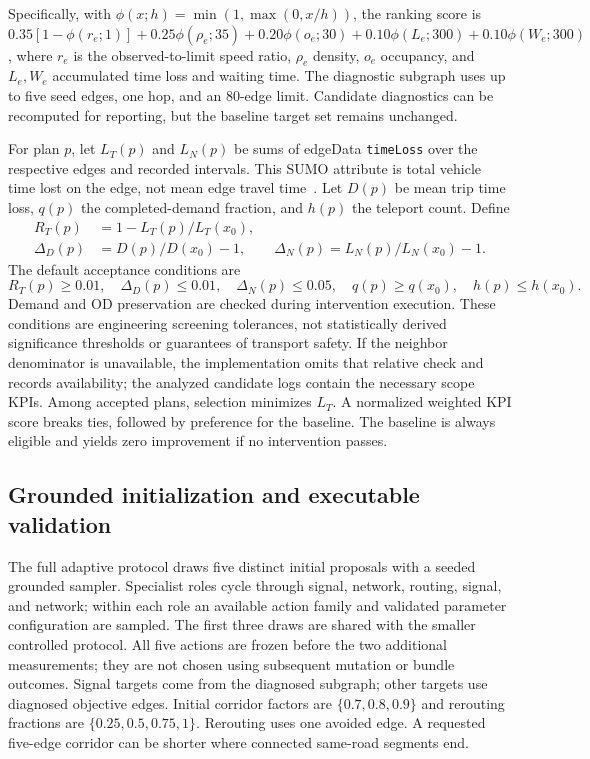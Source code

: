 \documentclass[11pt]{article}
\begin{document}
Specifically, with $\phi(x;h)=\min(1,\max(0,x/h))$, the ranking score is $0.35[1-\phi(r_e;1)]+0.25\phi(\rho_e;35)+0.20\phi(o_e;30)+0.10\phi(L_e;300)+0.10\phi(W_e;300)$, where $r_e$ is the observed-to-limit speed ratio, $\rho_e$ density, $o_e$ occupancy, and $L_e,W_e$ accumulated time loss and waiting time. The diagnostic subgraph uses up to five seed edges, one hop, and an 80-edge limit. Candidate diagnostics can be recomputed for reporting, but the baseline target set remains unchanged.

For plan $p$, let $L_T(p)$ and $L_N(p)$ be sums of edgeData \texttt{timeLoss} over the respective edges and recorded intervals. This SUMO attribute is total vehicle time lost on the edge, not mean edge travel time~\cite{sumoEdgeData}. Let $D(p)$ be mean trip time loss, $q(p)$ the completed-demand fraction, and $h(p)$ the teleport count. Define
\begin{align}
R_T(p)&=1-L_T(p)/L_T(x_0),\\
\Delta_D(p)&=D(p)/D(x_0)-1,\qquad
\Delta_N(p)=L_N(p)/L_N(x_0)-1.
\end{align}
The default acceptance conditions are
\begin{equation}
R_T(p)\geq 0.01,\quad \Delta_D(p)\leq0.01,\quad
\Delta_N(p)\leq0.05,\quad q(p)\geq q(x_0),\quad h(p)\leq h(x_0).
\label{eq:acceptance}
\end{equation}
Demand and OD preservation are checked during intervention execution. These conditions are engineering screening tolerances, not statistically derived significance thresholds or guarantees of transport safety. If the neighbor denominator is unavailable, the implementation omits that relative check and records availability; the analyzed candidate logs contain the necessary scope KPIs. Among accepted plans, selection minimizes $L_T$. A normalized weighted KPI score breaks ties, followed by preference for the baseline. The baseline is always eligible and yields zero improvement if no intervention passes.


\subsection{Grounded initialization and executable validation}\label{sec:initialization}
The full adaptive protocol draws five distinct initial proposals with a seeded grounded sampler. Specialist roles cycle through signal, network, routing, signal, and network; within each role an available action family and validated parameter configuration are sampled. The first three draws are shared with the smaller controlled protocol. All five actions are frozen before the two additional measurements; they are not chosen using subsequent mutation or bundle outcomes. Signal targets come from the diagnosed subgraph; other targets use diagnosed objective edges. Initial corridor factors are $\{0.7,0.8,0.9\}$ and rerouting fractions are $\{0.25,0.5,0.75,1\}$. Rerouting uses one avoided edge. A requested five-edge corridor can be shorter where connected same-road segments end.
\end{document}
